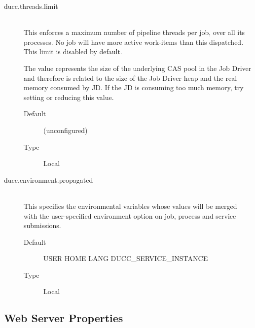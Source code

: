\begin{description}
       \item[ducc.threads.limit] \hfill \\
         This enforces a maximum number of pipeline threads per job, over all its processes. No 
         job will have more active work-items than this dispatched. This limit is disabled by default. 

         The value represents the size of the underlying CAS pool in the Job Driver and therefore
         is related to the size of the Job Driver heap and the real memory consumed by JD.  If
         the JD is consuming too much memory, try setting or reducing this value.
         
         \begin{description}
           \item[Default] (unconfigured) 
           \item[Type] Local 
         \end{description}

       \item[ducc.environment.propagated] \hfill \\
         This specifies the environmental variables whose values will be merged with the
         user-specified environment option on job, process and service submissions.

         \begin{description}
           \item[Default] USER HOME LANG DUCC\_SERVICE\_INSTANCE
           \item[Type] Local 
         \end{description}
                                                                        
      \end{description}  
        

\subsection{Web Server Properties}

